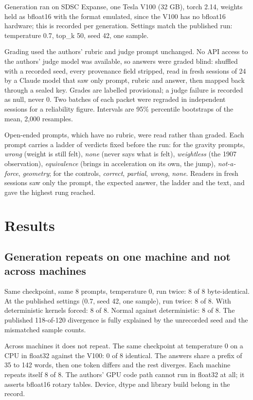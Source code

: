 \documentclass[reprint,prx,amsmath,amssymb,aps,superscriptaddress]{revtex4-2}
\begin{document}
Generation ran on SDSC Expanse, one Tesla V100 (32 GB), torch 2.14, weights held as bfloat16 with the format emulated, since the V100 has no bfloat16 hardware; this is recorded per generation. Settings match the published run: temperature 0.7, top\_k 50, seed 42, one sample.

Grading used the authors' rubric and judge prompt unchanged. No API access to the authors' judge model was available, so answers were graded blind: shuffled with a recorded seed, every provenance field stripped, read in fresh sessions of 24 by a Claude model that saw only prompt, rubric and answer, then mapped back through a sealed key. Grades are labelled provisional; a judge failure is recorded as null, never 0. Two batches of each packet were regraded in independent sessions for a reliability figure. Intervals are 95\% percentile bootstraps of the mean, 2,000 resamples.

Open-ended prompts, which have no rubric, were read rather than graded. Each prompt carries a ladder of verdicts fixed before the run: for the gravity prompts, \emph{wrong} (weight is still felt), \emph{none} (never says what is felt), \emph{weightless} (the 1907 observation), \emph{equivalence} (brings in acceleration on its own, the jump), \emph{not-a-force}, \emph{geometry}; for the controls, \emph{correct}, \emph{partial}, \emph{wrong}, \emph{none}. Readers in fresh sessions saw only the prompt, the expected answer, the ladder and the text, and gave the highest rung reached.

\section{Results}

\subsection{Generation repeats on one machine and not across machines}

Same checkpoint, same 8 prompts, temperature 0, run twice: 8 of 8 byte-identical. At the published settings (0.7, seed 42, one sample), run twice: 8 of 8. With deterministic kernels forced: 8 of 8. Normal against deterministic: 8 of 8. The published 118-of-120 divergence is fully explained by the unrecorded seed and the mismatched sample counts.

Across machines it does not repeat. The same checkpoint at temperature 0 on a CPU in float32 against the V100: 0 of 8 identical. The answers share a prefix of 35 to 142 words, then one token differs and the rest diverges. Each machine repeats itself 8 of 8. The authors' GPU code path cannot run in float32 at all; it asserts bfloat16 rotary tables. Device, dtype and library build belong in the record.
\end{document}
